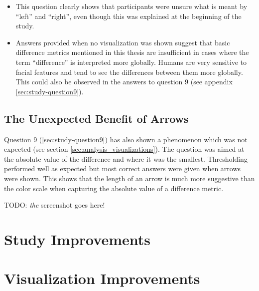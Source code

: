 \begin{itemize}
	\item This question clearly shows that participants were unsure what is meant by ``left'' and ``right'', even though this was explained at the beginning of the study.  
	\item Answers provided when no visualization was shown suggest that basic difference metrics mentioned in this thesis are insufficient in cases where the term ``difference'' is interpreted more globally. Humans are very sensitive to facial features and tend to see the differences between them more globally. This could also be observed in the answers to question 9 (see appendix \ref{sec:study-question9}).
\end{itemize}

\subsection{The Unexpected Benefit of Arrows}

Question 9 (\ref{sec:study-question9}) has also shown a phenomenon which was not expected (see section \ref{sec:analysis_visualizations}). The question was aimed at the absolute value of the difference and where it was the smallest. Thresholding performed well as expected but most correct answers were given when arrows were shown. This shows that the length of an arrow is much more suggestive than the color scale when capturing the absolute value of a difference metric.

TODO: {\it the} screenshot goes here!

\section{Study Improvements}

\section{Visualization Improvements}